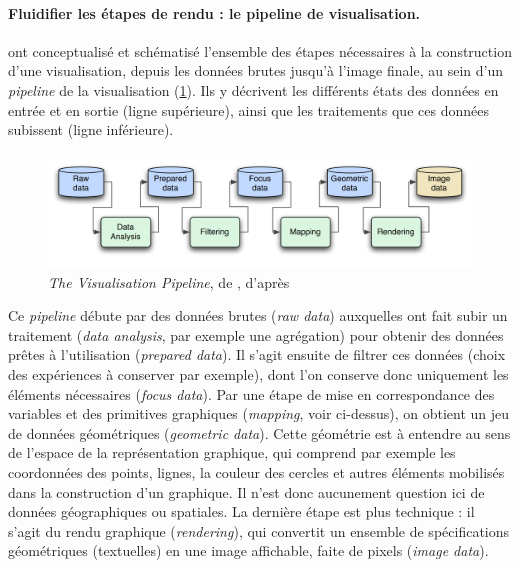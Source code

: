 \clearpage
\paragraph{Fluidifier les étapes de rendu : le \og pipeline de visualisation\fg{}.}\label{par:visualisation-pipeline}

\textcite{dos_santos_gaining_2004} ont conceptualisé et schématisé l'ensemble des étapes nécessaires à la construction d'une visualisation, depuis les données brutes jusqu'à l'image finale, au sein d'un \og \textit{pipeline}\fg{} de la visualisation (\cref{fig:visualisation-pipeline}).
Ils y décrivent les différents états des données en entrée et en sortie (ligne supérieure), ainsi que les traitements que ces données subissent (ligne inférieure).

\begin{figure}[H]
	\centering
	\includegraphics[width=\linewidth]{img/Visualisation_Pipeline_p92.png}
	\caption[\og \textit{The Visualisation Pipeline}\fg{}.]{\og \textit{The Visualisation Pipeline}\fg{}, de \textcite[92]{keim_mastering_2010}, d'après \textcite[314]{dos_santos_gaining_2004}}
	\label{fig:visualisation-pipeline}
\end{figure}

Ce \textit{pipeline} débute par des données brutes (\textit{raw data}) auxquelles ont fait subir un traitement (\textit{data analysis}, par exemple une agrégation) pour obtenir des données prêtes à l'utilisation (\textit{prepared data}).
Il s'agit ensuite de filtrer ces données (choix des expériences à conserver par exemple), dont l'on conserve donc uniquement les éléments nécessaires (\textit{focus data}).
Par une étape de mise en correspondance des variables et des primitives graphiques (\textit{mapping}, voir ci-dessus), on obtient un jeu de données \og géométriques \fg{} (\textit{geometric data}).
Cette géométrie est à entendre au sens de l'espace de la représentation graphique, qui comprend par exemple les coordonnées des points, lignes, la couleur des cercles et autres éléments mobilisés dans la construction d'un graphique.
Il n'est donc aucunement question ici de données géographiques ou spatiales.
La dernière étape est plus technique : il s'agit du rendu graphique (\textit{rendering}), qui convertit un ensemble de spécifications géométriques (textuelles) en une image affichable, faite de pixels (\textit{image data}).

